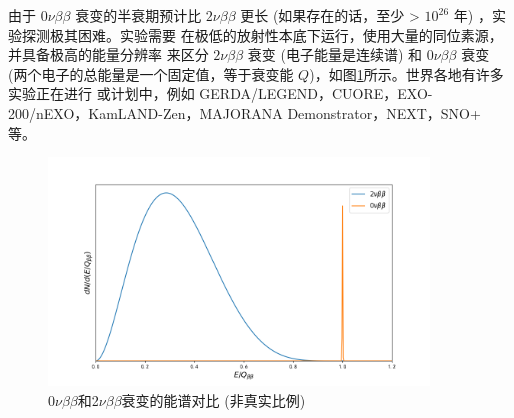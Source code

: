 由于 $0\nu\beta\beta$ 衰变的半衰期预计比 $2\nu\beta\beta$ 更长 
(如果存在的话，至少 > $10^{26}$ 年) ，实验探测极其困难。实验需要
在极低的放射性本底下运行，使用大量的同位素源，并具备极高的能量分辨率
来区分 $2\nu\beta\beta$ 衰变 (电子能量是连续谱) 和 $0\nu\beta\beta$ 衰变
 (两个电子的总能量是一个固定值，等于衰变能 $Q$)，如图\ref{fig:0vbb_2vbb}所示。世界各地有许多实验正在进行
或计划中，例如 GERDA/LEGEND，CUORE，EXO-200/nEXO，KamLAND-Zen，MAJORANA Demonstrator，NEXT，SNO+ 等。

\begin{figure}[htbp]
    \centering
    \includegraphics[width=0.9\textwidth]{figures/0vbb_2vbb.png}
    \caption{0$\nu\beta\beta$和2$\nu\beta\beta$衰变的能谱对比 (非真实比例)}
    \label{fig:0vbb_2vbb}
\end{figure}